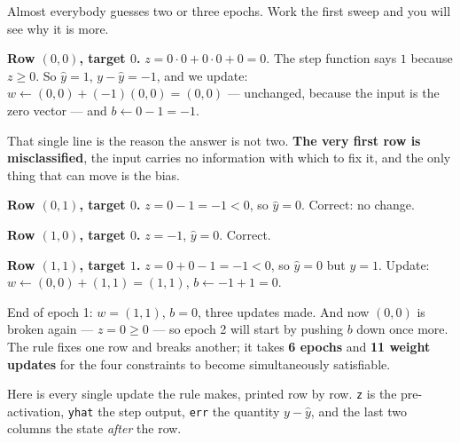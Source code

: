 \documentclass[11pt]{article}
\begin{document}
\begin{worked}
Almost everybody guesses two or three epochs. Work the first sweep and you
will see why it is more.

\textbf{Row $(0,0)$, target $0$.} $z = 0\cdot 0 + 0 \cdot 0 + 0 = 0$. The step
function says $1$ because $z \ge 0$. So $\hat y = 1$, $y - \hat y = -1$, and
we update: $w \leftarrow (0,0) + (-1)(0,0) = (0,0)$ --- unchanged, because the
input is the zero vector --- and $b \leftarrow 0 - 1 = -1$.

That single line is the reason the answer is not two. \textbf{The very first
row is misclassified}, the input carries no information with which to fix it,
and the only thing that can move is the bias.

\textbf{Row $(0,1)$, target $0$.} $z = 0 - 1 = -1 < 0$, so $\hat y = 0$.
Correct: no change.

\textbf{Row $(1,0)$, target $0$.} $z = -1$, $\hat y = 0$. Correct.

\textbf{Row $(1,1)$, target $1$.} $z = 0 + 0 - 1 = -1 < 0$, so $\hat y = 0$
but $y = 1$. Update: $w \leftarrow (0,0) + (1,1) = (1,1)$, $b \leftarrow
-1 + 1 = 0$.

End of epoch 1: $w = (1,1)$, $b = 0$, three updates made. And now $(0,0)$ is
broken again --- $z = 0 \ge 0$ --- so epoch 2 will start by pushing $b$ down
once more. The rule fixes one row and breaks another; it takes
\textbf{6 epochs} and \textbf{11 weight updates} for the four constraints to
become simultaneously satisfiable.
\end{worked}

Here is every single update the rule makes, printed row by row. \texttt{z} is
the pre-activation, \texttt{yhat} the step output, \texttt{err} the quantity
$y - \hat y$, and the last two columns the state \emph{after} the row.
\end{document}
